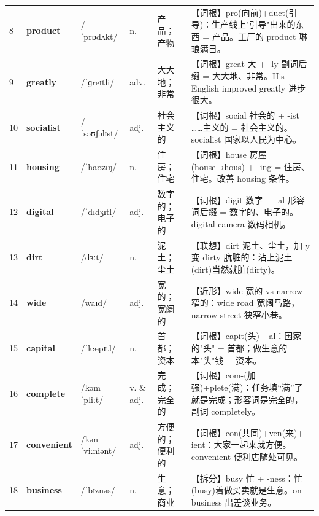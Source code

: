 \documentclass[UTF8,a4paper,11pt,oneside]{ctexbook}
\newcommand{\cellword}[1]{{\bfseries\textcolor{wordcol}{#1}}}
\newcommand{\cellipa}[1]{{\footnotesize\textcolor{ipacol}{#1}}}
\newcommand{\cellpos}[1]{\textcolor{poscol}{#1}}
\newcommand{\cellno}[1]{\textcolor{volcolor!75!black}{#1}}
\begin{document}
{\begin{longtable}{@{}C{0.045\textwidth}L{0.155\textwidth}L{0.175\textwidth}C{0.070\textwidth}L{0.180\textwidth}L{0.282\textwidth}@{}}
\cellno{8} & \cellword{product} & \cellipa{/ˈprɒdʌkt/} & \cellpos{n.} & 产品；产物 & \textcolor{tagRoot}{【词根】}pro(向前)+duct(引导)：生产线上"引导"出来的东西 = 产品。工厂的 product 琳琅满目。 \\
 \cellno{9} & \cellword{greatly} & \cellipa{/ˈɡreɪtli/} & \cellpos{adv.} & 大大地；非常 & \textcolor{tagRoot}{【词根】}great 大 + -ly 副词后缀 = 大大地、非常。His English improved greatly 进步很大。 \\
\cellno{10} & \cellword{socialist} & \cellipa{/ˈsəʊʃəlɪst/} & \cellpos{adj.} & 社会主义的 & \textcolor{tagRoot}{【词根】}social 社会的 + -ist ……主义的 = 社会主义的。socialist 国家以人民为中心。 \\
 \cellno{11} & \cellword{housing} & \cellipa{/ˈhaʊzɪŋ/} & \cellpos{n.} & 住房；住宅 & \textcolor{tagRoot}{【词根】}house 房屋(house→\allowbreak{}hous) + -ing = 住房、住宅。改善 housing 条件。 \\
\cellno{12} & \cellword{digital} & \cellipa{/ˈdɪdʒɪtl/} & \cellpos{adj.} & 数字的；电子的 & \textcolor{tagRoot}{【词根】}digit 数字 + -al 形容词后缀 = 数字的、电子的。digital camera 数码相机。 \\
 \cellno{13} & \cellword{dirt} & \cellipa{/dɜːt/} & \cellpos{n.} & 泥土；尘土 & \textcolor{tagAssoc}{【联想】}dirt 泥土、尘土，加 y 变 dirty 肮脏的：沾上泥土(dirt)当然就脏(dirty)。 \\
\cellno{14} & \cellword{wide} & \cellipa{/waɪd/} & \cellpos{adj.} & 宽的；宽阔的 & \textcolor{tagNear}{【近形】}wide 宽的 vs narrow 窄的：wide road 宽阔马路，narrow street 狭窄小巷。 \\
 \cellno{15} & \cellword{capital} & \cellipa{/ˈkæpɪtl/} & \cellpos{n.} & 首都；资本 & \textcolor{tagRoot}{【词根】}capit(头)+-al：国家的"头" = 首都；做生意的本"头"钱 = 资本。 \\
\cellno{16} & \cellword{complete} & \cellipa{/kəmˈpliːt/} & \cellpos{v.  \& adj.} & 完成；完全的 & \textcolor{tagRoot}{【词根】}com-(加强)+plete(满)：任务填“满”了就是完成；形容词是完全的，副词 completely。 \\
 \cellno{17} & \cellword{convenient} & \cellipa{/kənˈviːniənt/} & \cellpos{adj.} & 方便的；便利的 & \textcolor{tagRoot}{【词根】}con(共同)+ven(来)+-ient：大家一起来就方便。convenient 便利店随处可见。 \\
\cellno{18} & \cellword{business} & \cellipa{/ˈbɪznəs/} & \cellpos{n.} & 生意；商业 & \textcolor{tagSplit}{【拆分】}busy 忙 + -ness：忙(busy)着做买卖就是生意。on business 出差谈业务。 \\

\end{longtable}}
\end{document}
